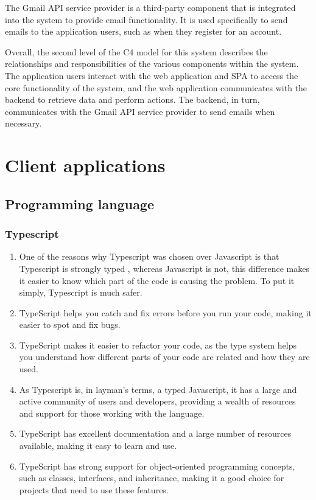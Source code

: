 \documentclass[singlespacing,12pt,parskip,headsepline,consistentlayout]{article}
\begin{document}
The Gmail API service provider is a third-party component that is integrated into the system to provide email functionality. It is used specifically to send emails to the application users, such as when they register for an account.

Overall, the second level of the C4 model for this system describes the relationships and responsibilities of the various components within the system. The application users interact with the web application and SPA to access the core functionality of the system, and the web application communicates with the backend to retrieve data and perform actions. The backend, in turn, communicates with the Gmail API service provider to send emails when necessary.

\section{Client applications}

\subsection{Programming language}
\subsubsection{Typescript}
\begin{enumerate}
    \item One of the reasons why Typescript was chosen over Javascript is that Typescript is strongly typed \cite{typescriptDocs}, whereas Javascript is not, this difference makes it easier to know which part of the code is causing the problem. To put it simply, Typescript is much safer.
    \item TypeScript helps you catch and fix errors before you run your code, making it easier to spot and fix bugs.
    \item TypeScript makes it easier to refactor your code, as the type system helps you understand how different parts of your code are related and how they are used.
    \item As Typescript is, in layman’s terms, a typed Javascript, it has a large and active community of users and developers, providing a wealth of resources and support for those working with the language.
    \item TypeScript has excellent documentation and a large number of resources available, making it easy to learn and use.
    \item TypeScript has strong support for object-oriented programming concepts, such as classes, interfaces, and inheritance, making it a good choice for projects that need to use these features.
\end{enumerate}
\end{document}
